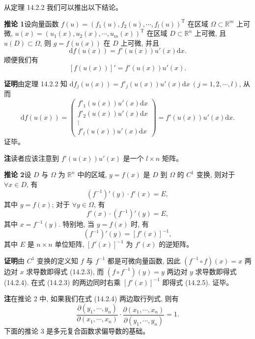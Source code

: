 \documentclass[UTF8, 12pt, fontset=fandol, oneside]{ctexart}
\begin{document}
从定理 14.2.2 我们可以推出以下结论。

\noindent\textbf{推论 1}\quad 设向量函数 $f(u)=(f_1(u),f_2(u),\cdots,f_l(u))^\mathrm T$ 在区域 $\Omega\subset\mathbb R^m$ 上可微, $u(x)=(u_1(x),u_2(x),\cdots,u_m(x))^\mathrm T$ 在区域 $D\subset\mathbb R^n$ 上可微, 且 $u(D)\subset\Omega$, 则 $g=f(u(x))$ 在 $D$ 上可微, 并且
\[
  \mathrm df(u(x))=f'(u(x))u'(x)\mathrm dx.
\]
顺便我们有
\[
  [f(u(x))]'=f'(u(x))u'(x).
\]

\noindent\textbf{证明}\quad 由定理 14.2.2 知 $\mathrm df_j(u(x))=f'_j(u(x))u'(x)\mathrm dx\ (j=1,2,\cdots,l)$, 从而
\[
  \mathrm df(u(x))=
  \begin{pmatrix}
    f'_1(u(x))u'(x)\mathrm dx\\
    f'_2(u(x))u'(x)\mathrm dx\\
    \vdots\\
    f'_l(u(x))u'(x)\mathrm dx
  \end{pmatrix}
  =f'(u(x))u'(x)\mathrm dx.
\]
证毕。

\noindent\textbf{注}\quad 读者应该注意到 $f'(u(x))u'(x)$ 是一个 $l\times n$ 矩阵。

\noindent\textbf{推论 2}\quad 设 $D$ 与 $\Omega$ 为 $\mathbb R^n$ 中的区域, $y=f(x)$ 是 $D$ 到 $\Omega$ 的 $C^1$ 变换, 则对于 $\forall x\in D$, 有
\begin{equation}
  (f^{-1})'(y)\cdot f'(x)=E,
\tag{14.2.3}
\end{equation}
其中 $y=f(x)$; 对于 $\forall y\in\Omega$, 有
\begin{equation}
  f'(x)\cdot(f^{-1})'(y)=E,
\tag{14.2.4}
\end{equation}
其中 $x=f^{-1}(y)$. 特别地, 当 $y=f(x)$ 时, 有
\begin{equation}
  (f^{-1})'(y)=[f'(x)]^{-1},
\tag{14.2.5}
\end{equation}
其中 $E$ 是 $n\times n$ 单位矩阵, $[f'(x)]^{-1}$ 为 $f'(x)$ 的逆矩阵。

\noindent\textbf{证明}\quad 由 $C^1$ 变换的定义知 $f$ 与 $f^{-1}$ 都是可微向量函数, 因此 $(f^{-1}\circ f)(x)=x$ 两边对 $x$ 求导数即得式 (14.2.3), 而 $(f\circ f^{-1})(y)=y$ 两边对 $y$ 求导数即得式 (14.2.4). 在式 (14.2.3) 的两边同时右乘 $[f'(x)]^{-1}$ 即得式 (14.2.5). 证毕。

\noindent\textbf{注}\quad 在推论 2 中, 如果我们在式 (14.2.4) 两边取行列式, 则有
\begin{equation}
  \frac{\partial(y_1,\cdots,y_n)}{\partial(x_1,\cdots,x_n)}
  \cdot
  \frac{\partial(x_1,\cdots,x_n)}{\partial(y_1,\cdots,y_n)}
  =1.
\tag{14.2.6}
\end{equation}
下面的推论 3 是多元复合函数求偏导数的基础。
\end{document}
